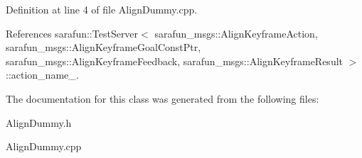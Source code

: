 Definition at line 4 of file Align\-Dummy.\-cpp.



References sarafun\-::\-Test\-Server$<$ sarafun\-\_\-msgs\-::\-Align\-Keyframe\-Action, sarafun\-\_\-msgs\-::\-Align\-Keyframe\-Goal\-Const\-Ptr, sarafun\-\_\-msgs\-::\-Align\-Keyframe\-Feedback, sarafun\-\_\-msgs\-::\-Align\-Keyframe\-Result $>$\-::action\-\_\-name\-\_\-.



The documentation for this class was generated from the following files\-:\begin{DoxyCompactItemize}
\item 
Align\-Dummy.\-h\item 
Align\-Dummy.\-cpp\end{DoxyCompactItemize}
